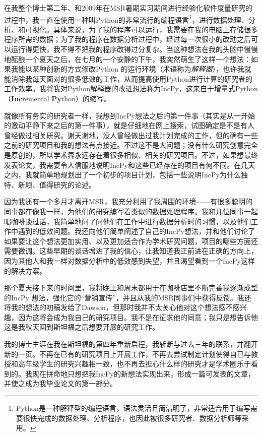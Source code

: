 \documentclass[letter,12pt]{book}
\begin{document}
\begin{CJK}{UTF8}{gbsn}
在我整个博士第二年、和2009年在MSR暑期实习期间进行经验化软件度量研究的过程中，我一直在使用一种叫Python的非常流行的编程语言\footnote{Python是一种解释型的编程语言，语法灵活且简洁明了，非常适合用于编写需要很快完成的数据处理、分析程序，也因此被很多研究者、数据分析师等采用。}，进行数据处理、分析、和可视化。具体来说，为了我的程序可以运行，我需要在我的电脑上存储很多程序所需的数据；为了我的程序在数据分析过程中，经过每一次很小的改动之后可以运行得更快，我不得不把我的程序改得过分复杂。当这种想法在我的头脑中慢慢地酝酿一个夏天之后，在七月的一个安静的下午，我突然萌生了这样一个想法：如果我能以某种创新的方式修改Python 的运行环境（术语称为\emph{解释器}），也许我就能消除我每天面对的很多低效的工作，从而提高使用Python进行计算的研究者的工作效率。我将我对Python解释器的改进想法称为IncPy，这来自于增量式Python （\textbf{Inc}remental \textbf{Py}thon）的缩写。

\breakline

就像所有务实的研究者一样，我想到IncPy想法之后的第一件事（其实是从一开始的激动平静下来之后的第一件事），就是仔细地在网上搜索，试图确定是不是有人曾经做过相关研究。谢天谢地，没人曾经做出过我计划完成的工作，但的确有一些之前的研究项目和我的想法有点接近。不过这不是大问题；没有什么研究创意完全是原创的，所以学术界永远存在着很多相似、相关的研究项目。不过，如果想最终发表论文，我需要令人信服地说明IncPy和这些已经存在的项目有何不同。在几天之内，我就简单地规划出了一个初步的项目计划，包括一些说明IncPy为什么独特、新颖、值得研究的论述。

因为我还有一个多月才离开MSR，我充分利用了我周围的环境——有很多聪明的同事都在像我一样，为他们的研究编写着类似的数据处理程序。我和几位同事一起喝咖啡谈过话，我简单地问了问他们在工作中进行数据分析时的习惯，以及他们工作中遇到的低效问题。我还向他们简单阐述了自己的IncPy想法，并和他们讨论了如果要让这个想法更加实用、以及更加适合作为学术研究问题，项目的哪些方面还需要微调。这些早期的谈话增进了我的信心，让我知道我正前进在正确的方向上，因为其他人和我一样对数据分析中的低效感到失望，并且渴望看到一个IncPy这样的解决方案。

那个夏天接下来的时间里，我将晚上和周末都用于在咖啡店里不断完善我逐渐成型的IncPy 想法，强化它的“营销宣传”，并且从我的MSR同事们中获得反馈。我还将我的想法的初稿发给了Dawson，但那时我并不太关心他对这个想法感不感兴趣，因为这将会成为我自己的研究项目。我不是在征求他的同意；我只是想告诉他这是我秋天回到斯坦福之后想要开展的研究工作。

\breakline

我的博士生涯在我在斯坦福的第四年重新启程，我斩断与过去三年的联系，并翻开新的一页。不再在已有的研究项目上开展工作，不再去尝试制定计划使得自已与教授和高年级学生的研究兴趣相一致，也不再去担心什么样的研究才是学术圈乐于看到的。我现在拼命地只想把我IncPy的新想法实现出来，形成一篇可发表的文章，并使之成为我毕业论文的第一部分。


\end{CJK}
\end{document}
